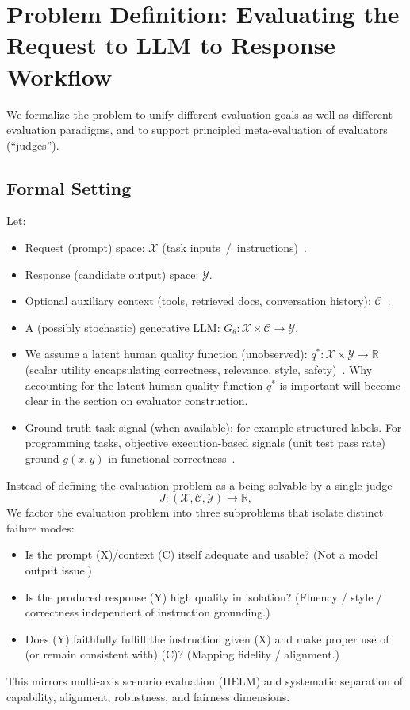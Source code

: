 \section{Problem Definition: Evaluating the Request to LLM to Response Workflow}

We formalize the problem to unify different evaluation goals as well as different evaluation paradigms, and to support principled meta-evaluation of evaluators (``judges'').

\subsection{Formal Setting}
Let:
\begin{itemize}
	\item Request (prompt) space: $\mathcal{X}$ (task inputs~/~instructions)~\cite{srivastava2022bigbench, liang2022helm}.
	\item Response (candidate output) space: $\mathcal{Y}$.
	\item Optional auxiliary context (tools, retrieved docs, conversation history): $\mathcal{C}$~\cite{liang2022helm}.
	\item A (possibly stochastic) generative LLM: $G_{\theta}: \mathcal{X} \times \mathcal{C} \to \mathcal{Y}$.
	\item We assume a latent human quality function (unobserved): $q^{*}: \mathcal{X} \times \mathcal{Y} \to \mathbb{R}$ (scalar utility encapsulating correctness, relevance, style, safety)~\cite{stiennon2020learning, ouyang2022training}. Why accounting for the latent human quality function $q^{*}$ is important will become clear in the section on evaluator construction.
	\item Ground-truth task signal (when available): for example structured labels. For programming tasks, objective execution-based signals (unit test pass rate) ground $g(x,y)$ in functional correctness~\cite{chen2021evaluating}.
\end{itemize}

Instead of defining the evaluation problem as a being solvable by a single judge
\begin{equation}
	J: (\mathcal{X},\mathcal{C},\mathcal{Y}) \to \mathbb{R},
\end{equation}  
We factor the evaluation problem into three subproblems that isolate distinct failure modes:

\begin{itemize}
    \item Is the prompt (X)/context (C) itself adequate and usable? (Not a model output issue.)
    \item Is the produced response (Y) high quality in isolation? (Fluency / style / correctness independent of instruction grounding.)
    \item Does (Y) faithfully fulfill the instruction given (X) and make proper use of (or remain consistent with) (C)? (Mapping fidelity / alignment.)
\end{itemize}
This mirrors multi-axis scenario evaluation (HELM) and systematic separation of capability, alignment, robustness, and fairness dimensions. %

